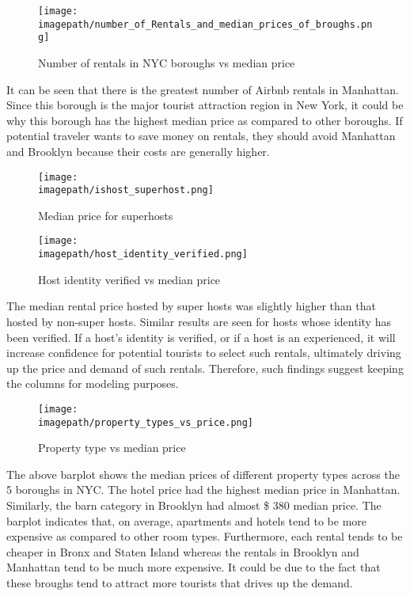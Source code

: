 \documentclass[conference]{IEEEtran}
\newcommand{\imagepath}{C:/Users/Lenovo/Desktop/SEM 6/BIG DATA/BIG_DATA_COURSEWORK/Images for Latex/}
\begin{document}
\begin{figure}[H]
  \centering
  \texttt{[image: \\imagepath/number\_of\_Rentals\_and\_median\_prices\_of\_broughs.png]}
  \caption{Number of rentals in NYC boroughs vs median price}
  \label{fig: your_label}
\end{figure}

It can be seen that there is the greatest number of Airbnb rentals in Manhattan. Since this borough is the major tourist attraction region in New York, it could be why this borough has the highest median price as compared to other boroughs. If potential traveler wants to save money on rentals, they should avoid Manhattan and Brooklyn because their costs are generally higher. \newline



\begin{figure}[H]
  \centering
  \texttt{[image: \\imagepath/ishost\_superhost.png]}
  \caption{Median price for superhosts}
  \label{fig: your_label}
\end{figure}

\begin{figure}[H]
  \centering
  \texttt{[image: \\imagepath/host\_identity\_verified.png]}
  \caption{Host identity verified vs median price}
  \label{fig: your_label}
\end{figure}

The median rental price hosted by super hosts was slightly higher than that hosted by non-super hosts. Similar results are seen for hosts whose identity has been verified. If a host’s identity is verified, or if a host is an experienced, it will increase confidence for potential tourists to select such rentals, ultimately driving up the price and demand of such rentals. Therefore, such findings suggest keeping the columns for modeling purposes. \newline

\begin{figure}[H]
  \centering
  \texttt{[image: \\imagepath/property\_types\_vs\_price.png]}
  \caption{Property type vs median price}
  \label{fig: your_label}
\end{figure}

The above barplot shows the median prices of different property types across the 5 boroughs in NYC. The hotel price had the highest median price in Manhattan. Similarly, the barn category in Brooklyn had almost \$ 380 median price. The barplot indicates that, on average, apartments and hotels tend to be more expensive as compared to other room types. Furthermore, each rental tends to be cheaper in Bronx and Staten Island whereas the rentals in Brooklyn and Manhattan tend to be much more expensive. It could be due to the fact that these broughs tend to attract more tourists that drives up the demand. \newline
\end{document}
